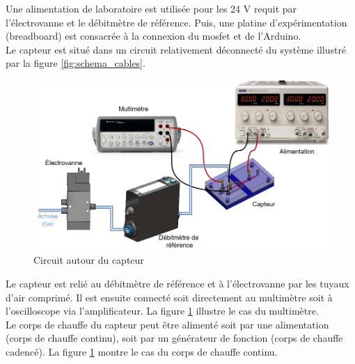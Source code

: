 Une alimentation de laboratoire est utilisée pour les 24 V requit par l'électrovanne et le débitmètre de référence. Puis, une platine d'expérimentation 
(breadboard) est consacrée à la connexion du \gls{mosfet} et de l'Arduino. \\

Le capteur est situé dans un circuit relativement déconnecté du système illustré par la figure \ref{fig:schema_cables}. 
\begin{figure}[H]
    \centering
    \includegraphics[scale=0.35]{assets/figures/Raccord_air.png}
    \caption{Circuit autour du capteur}
    \label{fig:circuit_capteur}
\end{figure}
Le capteur est relié au débitmètre de référence et à l'électrovanne par les tuyaux d'air comprimé. Il est ensuite connecté soit directement au 
multimètre soit à l'oscilloscope via l'amplificateur. La figure \ref{fig:circuit_capteur} illustre le cas du multimètre. \\

Le corps de chauffe du capteur peut être alimenté soit par une alimentation (corps de chauffe continu), soit par un générateur de fonction (corps 
de chauffe cadencé). La figure \ref{fig:circuit_capteur} montre le cas du corps de chauffe continu. 

